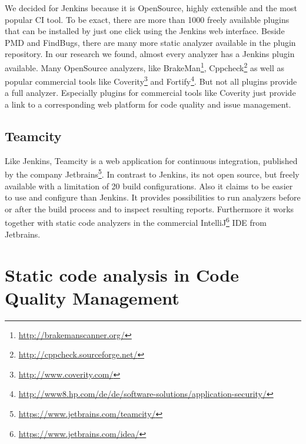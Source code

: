 \documentclass[conference]{IEEEtran}
\begin{document}
We decided for Jenkins because it is OpenSource, highly extensible and the most popular CI tool. To be exact, there are more than 1000 freely available plugins that can be installed by just one click using the Jenkins web interface.
Beside PMD and FindBugs, there are many more static analyzer available in the plugin repository.
In our research we found, almost every analyzer has a Jenkins plugin available.
Many OpenSource analyzers, like BrakeMan\footnote{\href{http://brakemanscanner.org/}{http://brakemanscanner.org/}}, Cppcheck\footnote{\href{http://cppcheck.sourceforge.net/}{http://cppcheck.sourceforge.net/}} as well as popular commercial tools like Coverity\footnote{\href{http://www.coverity.com/}{http://www.coverity.com/}} and Fortify\footnote{\href{http://www8.hp.com/de/de/software-solutions/application-security/}{http://www8.hp.com/de/de/software-solutions/application-security/}}.
But not all plugins provide a full analyzer.
Especially plugins for commercial tools like Coverity just provide a link to a corresponding web platform for code quality and issue management. 




\subsection{Teamcity}
\label{subsec:teamcity}
Like Jenkins, Teamcity is a web application for continuous integration, published by the company Jetbrains\footnote{\href{https://www.jetbrains.com/teamcity/}{https://www.jetbrains.com/teamcity/}}. In contrast to Jenkins, its not open source, but freely available with a limitation of 20 build configurations.
Also it claims to be easier to use and configure than Jenkins.
It provides possibilities to run analyzers before or after the build process and to inspect resulting reports.
Furthermore it works together with static code analyzers in the commercial IntelliJ\footnote{\href{https://www.jetbrains.com/idea/}{https://www.jetbrains.com/idea/}} IDE from Jetbrains.



\section{Static code analysis in Code Quality Management}
\label{sec:static_code_analysis_code_quality_management}
\end{document}
